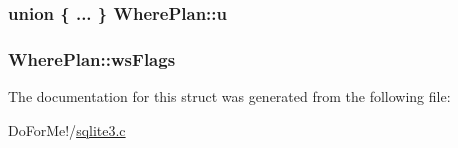 \hypertarget{struct_where_plan_a00bc8b9f4e902606b3ca733878ff7131}{
\subsubsection[{u}]{\setlength{\rightskip}{0pt plus 5cm}union \{ ... \}   Where\-Plan\-::u}}\label{struct_where_plan_a00bc8b9f4e902606b3ca733878ff7131}
\hypertarget{struct_where_plan_a6b81c2c91b28ac8898f382db2da6707b}{
\subsubsection[{ws\-Flags}]{ Where\-Plan\-::ws\-Flags}}\label{struct_where_plan_a6b81c2c91b28ac8898f382db2da6707b}


The documentation for this struct was generated from the following file\-:\begin{DoxyCompactItemize}
\item 
Do\-For\-Me!/\hyperlink{sqlite3_8c}{sqlite3.\-c}\end{DoxyCompactItemize}
